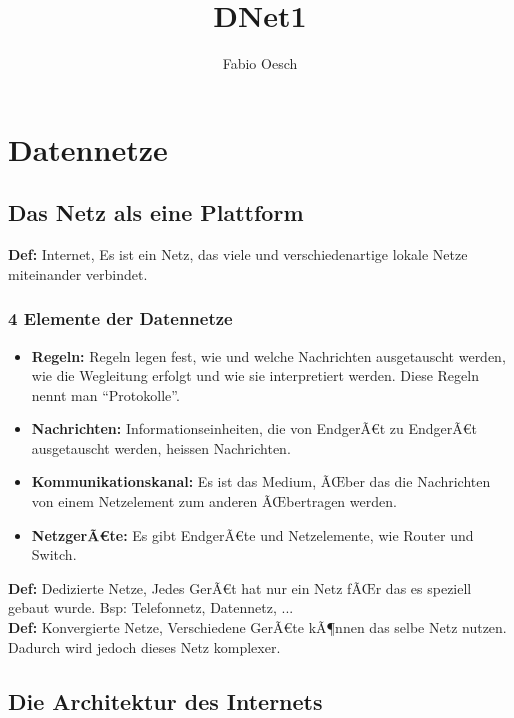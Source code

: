 \documentclass[a4paper,10pt]{article}
\author{Fabio Oesch}
\title{DNet1}
\newcommand{\Bold}[1]{\textbf{#1}} %
\begin{document}
\maketitle
\pagebreak
\thispagestyle{fancy} %
\tableofcontents
\pagebreak
\section{Datennetze}
\subsection{Das Netz als eine Plattform}
\Bold{Def:} Internet, Es ist ein Netz, das viele und verschiedenartige lokale Netze miteinander verbindet.
\subsubsection*{4 Elemente der Datennetze}
\begin{itemize}
 \item \Bold{Regeln:} Regeln legen fest, wie und welche Nachrichten ausgetauscht werden, wie die Wegleitung erfolgt und wie sie interpretiert werden. Diese Regeln nennt man "`Protokolle"'.
 \item \Bold{Nachrichten:} Informationseinheiten, die von EndgerÃ€t zu EndgerÃ€t ausgetauscht werden, heissen Nachrichten.
 \item \Bold{Kommunikationskanal:} Es ist das Medium, ÃŒber das die Nachrichten von einem Netzelement zum anderen ÃŒbertragen werden.
 \item \Bold{NetzgerÃ€te:} Es gibt EndgerÃ€te und Netzelemente, wie Router und Switch.
\end{itemize}
\Bold{Def:} Dedizierte Netze, Jedes GerÃ€t hat nur ein Netz fÃŒr das es speziell gebaut wurde. Bsp: Telefonnetz, Datennetz, ...\\
\Bold{Def:} Konvergierte Netze, Verschiedene GerÃ€te kÃ¶nnen das selbe Netz nutzen. Dadurch wird jedoch dieses Netz komplexer.
\subsection{Die Architektur des Internets}
\end{document}
